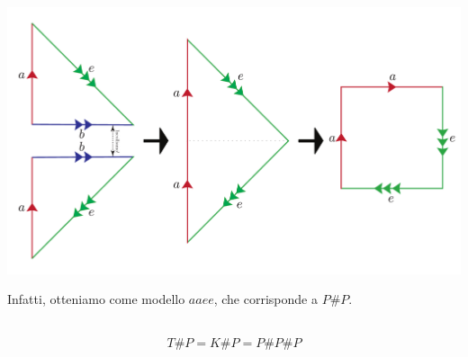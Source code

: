 \begin{observe}
\begin{center}
	\includegraphics[trim=0cm 0cm 0cm 0cm, clip, scale=0.3]{images/kleintoprojdouble2.pdf}
\end{center}
Infatti, otteniamo come modello $aaee$, che corrisponde a $P\# P$.
\end{observe}
\begin{lemming}~{}\\
	\begin{equation}
		T\# P= K\# P=P\# P\# P
	\end{equation}
\vspace{-6mm}
\end{lemming}

